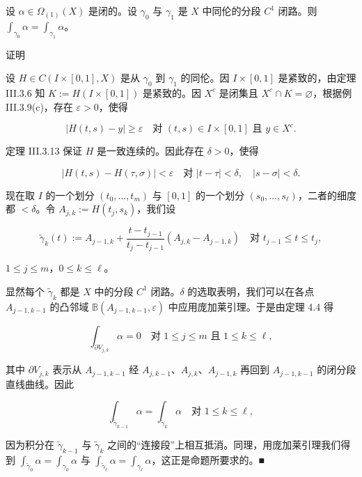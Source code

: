 \begin{proposition}

设 $ \alpha \in \Omega_{(1)}(X) $ 是闭的。设 $ \gamma_{0} $ 与 $ \gamma_{1} $ 是 $ X $ 中同伦的分段 $ C^{1} $ 闭路。则 $ \int_{\gamma_{0}}\alpha = \int_{\gamma_{1}}\alpha $。

证明

\begin{subitems}
\item

设 $ H \in C(I\times[0,1],X) $ 是从 $ \gamma_{0} $ 到 $ \gamma_{1} $ 的同伦。因 $ I\times[0,1] $ 是紧致的，由定理 III.3.6 知 $ K := H(I\times[0,1]) $ 是紧致的。因 $ X^{c} $ 是闭集且 $ X^{c}\cap K = \varnothing $，根据例 III.3.9(c)，存在 $ \varepsilon > 0 $，使得

\[
|H(t,s) - y| \ge \varepsilon \quad \text{对 } (t,s) \in I\times[0,1] \text{ 且 } y \in X^{c} .
\]

定理 III.3.13 保证 $ H $ 是一致连续的。因此存在 $ \delta > 0 $，使得

\[
|H(t,s) - H(\tau,\sigma)| < \varepsilon \quad \text{对 } |t - \tau| < \delta , \quad |s - \sigma| < \delta .
\]
\item

现在取 $ I $ 的一个划分 $ (t_{0},\ldots,t_{m}) $ 与 $ [0,1] $ 的一个划分 $ (s_{0},\ldots,s_{\ell}) $，二者的细度都 $ < \delta $。令 $ A_{j,k} := H(t_{j},s_{k}) $，我们设

\[
\tilde{\gamma}_{k}(t) := A_{j-1,k} + \frac{t - t_{j-1}}{t_{j} - t_{j-1}}\left(A_{j,k} - A_{j-1,k}\right) \quad \text{对 } t_{j-1} \le t \le t_{j} ,
\]

$ 1 \le j \le m $，$ 0 \le k \le \ell $。

\end{subitems}


显然每个 $ \tilde{\gamma}_{k} $ 都是 $ X $ 中的分段 $ C^{1} $ 闭路。$ \delta $ 的选取表明，我们可以在各点 $ A_{j-1,k-1} $ 的凸邻域 $ \mathbb{B}(A_{j-1,k-1},\varepsilon) $ 中应用庞加莱引理。于是由定理 4.4 得

\[
\int_{\partial V_{j,k}}\alpha = 0 \quad \text{对 } 1 \le j \le m \text{ 且 } 1 \le k \le \ell ,
\]

其中 $ \partial V_{j,k} $ 表示从 $ A_{j-1,k-1} $ 经 $ A_{j,k-1} $、$ A_{j,k} $、$ A_{j-1,k} $ 再回到 $ A_{j-1,k-1} $ 的闭分段直线曲线。因此

\[
\int_{\tilde{\gamma}_{k-1}}\alpha = \int_{\tilde{\gamma}_{k}}\alpha \quad \text{对 } 1 \le k \le \ell ,
\]

因为积分在 $ \tilde{\gamma}_{k-1} $ 与 $ \tilde{\gamma}_{k} $ 之间的“连接段”上相互抵消。同理，用庞加莱引理我们得到 $ \int_{\tilde{\gamma}_{0}}\alpha = \int_{\gamma_{0}}\alpha $ 与 $ \int_{\tilde{\gamma}_{\ell}}\alpha = \int_{\gamma_{\ell}}\alpha $，这正是命题所要求的。\nobreak\hspace{0.35em}■

\end{proposition}

